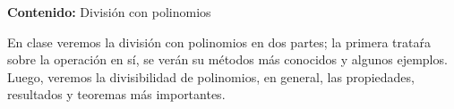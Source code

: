 {\Large\textbf{Contenido:} División con polinomios}

En clase veremos la división con polinomios en dos partes; la primera trataŕa sobre la operación en sí, se verán su métodos más conocidos y algunos ejemplos.
Luego, veremos la divisibilidad de polinomios, en general, las propiedades, resultados y teoremas más importantes.
